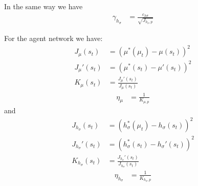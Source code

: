 \documentclass[]{article}
\begin{document}
In the same way we have 
\begin{align}
	\gamma_{h_\sigma}&	= \frac{\varepsilon_{h\sigma}}{\sqrt{J_{h_\sigma, p} } }
\end{align}

For the agent network we have:
\begin{align*}
	J_\mu(s_t)&		= (\mu^*(\mu_t) - \mu(s_t))^2
	\\
	J_\mu'(s_t)&	= (\mu^*(s_t) - \mu'(s_t))^2
	\\
	K_\mu(s_t)&		= \frac{J_\mu'(s_t)}{J_\mu(s_t)}
\end{align*}
\begin{align}
	\eta_\mu&		= \frac{1}{K_{\mu, p}}
\end{align}
and
\begin{align*}
	J_{h_\sigma}(s_t)&		= (h_\sigma^*(\mu_t) - h_\sigma(s_t))^2
	\\
	J_{h_\sigma}'(s_t)&		= (h_\sigma^*(s_t) - h_\sigma'(s_t))^2
	\\
	K_{h_\sigma}(s_t)&		= \frac{J_{h_\sigma}'(s_t)}{J_{h_\sigma}(s_t)}
\end{align*}
\begin{align}
	\eta_{h_\sigma}&		= \frac{1}{K_{h_\sigma, p}}
\end{align}
\end{document}
